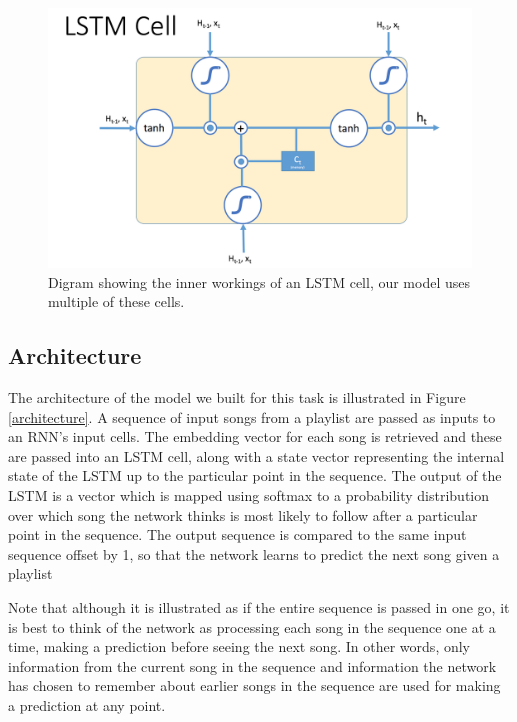 \documentclass{article} %
\begin{document}
\begin{figure}
	\label{LSTM_cell}
	\begin{center}
		\includegraphics[scale = 0.4]{"../images/LSTM_cell"}
		\caption{Digram showing the inner workings of an LSTM cell, our model uses multiple of these cells.}
	\end{center}
\end{figure}

\subsection{Architecture}
The architecture of the model we built for this task is illustrated in Figure \ref{architecture}. A sequence of input songs from a playlist are passed as inputs to an RNN's input cells. The embedding vector for each song is retrieved and these are passed into an LSTM cell, along with a state vector representing the internal state of the LSTM up to the particular point in the sequence. The output of the LSTM is a vector which is mapped using softmax to a probability distribution over which song the network thinks is most likely to follow after a particular point in the sequence. The output sequence is compared to the same input sequence offset by 1, so that the network learns to predict the next song given a playlist 

Note that although it is illustrated as if the entire sequence is passed in one go, it is best to think of the network as processing each song in the sequence one at a time, making a prediction before seeing the next song. In other words, only information from the current song in the sequence and information the network has chosen to remember about earlier songs in the sequence are used for making a prediction at any point.  
\end{document}
